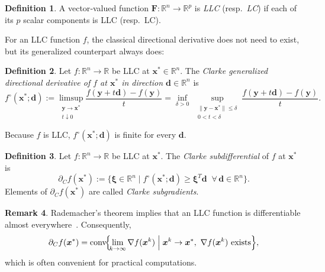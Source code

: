 \documentclass{article}
\theoremstyle{definition}
\newtheorem{maar}{Definition}[section]
\newtheorem{rem}[maar]{Remark}
\begin{document}
\begin{maar}\cite{BaKaMa}
A vector‑valued function $\boldsymbol F:\mathbb{R}^{n}\to\mathbb{R}^{p}$ is \emph{LLC} (resp.\ \emph{LC}) if each of its $p$ scalar components is LLC (resp.\ LC).
\end{maar}

For an LLC function $f$, the classical directional derivative does not need to exist, but its generalized counterpart always does:

\begin{maar}\cite{Cla}\label{def:GDD}
Let $f:\mathbb{R}^{n}\to\mathbb{R}$ be LLC at $\boldsymbol x^{\ast}\in\mathbb{R}^{n}$.  
The \emph{Clarke generalized directional derivative of $f$ at $\boldsymbol x^{\ast}$ in direction $\boldsymbol d\in\mathbb{R}^{n}$} is  
\[
  f^{\circ}(\boldsymbol x^{\ast};\boldsymbol d)
  :=\limsup_{\substack{\boldsymbol y\to\boldsymbol x^{\ast}\\ t\downarrow 0}}
           \frac{f(\boldsymbol y+t\boldsymbol d)-f(\boldsymbol y)}{t}
  =\inf_{\delta>0}\ \sup_{\substack{\|\boldsymbol y-\boldsymbol x^{\ast}\|\le\delta\\0<t<\delta}}
           \frac{f(\boldsymbol y+t\boldsymbol d)-f(\boldsymbol y)}{t}.
\]
\end{maar}

Because $f$ is LLC, $f^{\circ}(\boldsymbol x^{\ast};\boldsymbol d)$ is finite for every $\boldsymbol d$.

\begin{maar}\cite{Cla}\label{def:ClarkeSubdiff}
Let $f:\mathbb{R}^{n}\to\mathbb{R}$ be LLC at $\boldsymbol x^{\ast}$.  
The \emph{Clarke subdifferential} of $f$ at $\boldsymbol x^{\ast}$ is  
\[
  \partial_{C}f(\boldsymbol x^{\ast})
  :=\bigl\{\boldsymbol\xi\in\mathbb{R}^{n}\mid
          f^{\circ}(\boldsymbol x^{\ast};\boldsymbol d)
          \ge \boldsymbol\xi^{T}\boldsymbol d
          \;\;\forall\,\boldsymbol d\in\mathbb{R}^{n}\bigr\}.
\]
Elements of $\partial_{C}f(\boldsymbol x^{\ast})$ are called \emph{Clarke subgradients}.
\end{maar}

\begin{rem}
Rademacher’s theorem implies that an LLC function is differentiable almost everywhere~\cite[Thm.\,9.60]{RW09}.  Consequently,
\begin{equation}\label{eq:ClarkeSubdiffConv}
  \partial_{C}f(\boldsymbol x^{\ast})
  =\operatorname{conv}\!\Bigl\{\!\lim_{k\to\infty}\nabla f(\boldsymbol x^{k})\;\Big|\;
      \boldsymbol x^{k}\to\boldsymbol x^{\ast},
      \ \nabla f(\boldsymbol x^{k})\text{ exists}\Bigr\},
\end{equation}
which is often convenient for practical computations.
\end{rem}
\end{document}
